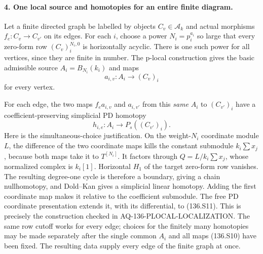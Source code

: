 \paragraph{4. One local source and homotopies for an entire finite diagram.}
Let a finite directed graph be labelled by objects
$C_v\in\mathcal A_k$ and actual morphisms
$f_e:C_v\to C_{v'}$ on its edges. For each $i$, choose
a power $N_i=p_i^{a_i}$ so large that every zero-form
row $(C_v)_i^{N_i,0}$ is horizontally acyclic.
There is one such power for all vertices, since they
are finite in number. The p-local construction gives
the basic admissible source
$A_i=B_{N_i}(k_i)$ and maps
\[
                         a_{i,v}:A_i\longrightarrow(C_v)_i
                                                               \tag{136.S10}
\]
for every vertex.

For each edge, the two maps $f_ea_{i,v}$ and
$a_{i,v'}$ from this \emph{same} $A_i$ to $(C_{v'})_i$
have a coefficient-preserving simplicial PD homotopy
\[
                  h_{i,e}:A_i\longrightarrow P_s((C_{v'})_i).
                                                               \tag{136.S11}
\]
Here is the simultaneous-choice justification. On the
weight-$N_i$ coordinate module $L$, the difference of
the two coordinate maps kills the constant submodule
$k_i\sum x_j$, because both maps take it to $T^{[N_i]}$.
It factors through $Q=L/k_i\sum x_j$, whose normalized
complex is $k_i[1]$. Horizontal $H_1$ of the target
zero-form row vanishes. The resulting degree-one
cycle is therefore a boundary, giving a chain
nullhomotopy, and Dold--Kan gives a simplicial linear
homotopy. Adding the first coordinate map makes it
relative to the coefficient submodule. The free PD
coordinate presentation extends it, with its
differential, to (136.S11). This is precisely the
construction checked in AQ-136-PLOCAL-LOCALIZATION.
The same row cutoff works for every edge; choices for
the finitely many homotopies may be made separately
after the single common $A_i$ and all maps (136.S10)
have been fixed. The resulting data supply every
edge of the finite graph at once.

